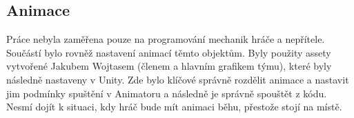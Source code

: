 \subsection{Animace}

Práce nebyla zaměřena pouze na programování mechanik hráče a nepřítele. Součástí bylo rovněž nastavení animací těmto objektům. Byly použity assety vytvořené Jakubem Wojtasem (členem a hlavním grafikem týmu), které byly následně nastaveny v Unity. Zde bylo klíčové správně rozdělit animace a nastavit jim podmínky spuštění v Animatoru a následně je správně spouštět z kódu. Nesmí dojít k situaci, kdy hráč bude mít animaci běhu, přestože stojí na místě.